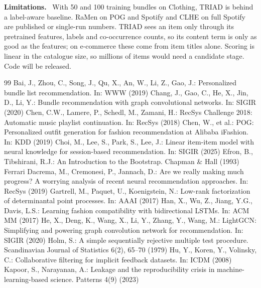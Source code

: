 \documentclass[runningheads]{llncs}
\renewcommand{\paragraph}[1]{\smallskip\noindent\textbf{#1}\ }
\begin{document}
\paragraph{Limitations.} With 50 and 100 training bundles on Clothing, TRIAD is behind a label-aware baseline. RaMen
on POG and Spotify and CLHE on full Spotify are published or single-run numbers. TRIAD sees an item only through its
pretrained features, labels and co-occurrence counts, so its content term is only as good as the features; on
e-commerce these come from item titles alone. Scoring is linear in the catalogue size, so millions of items would need
a candidate stage. Code will be released.

\begin{thebibliography}{99}\scriptsize
{} Bai, J., Zhou, C., Song, J., Qu, X., An, W., Li, Z., Gao, J.: Personalized bundle list recommendation. In: WWW (2019)
 Chang, J., Gao, C., He, X., Jin, D., Li, Y.: Bundle recommendation with graph convolutional networks. In: SIGIR (2020)
 Chen, C.W., Lamere, P., Schedl, M., Zamani, H.: RecSys Challenge 2018: Automatic music playlist continuation. In: RecSys (2018)
 Chen, W., et al.: POG: Personalized outfit generation for fashion recommendation at Alibaba iFashion. In: KDD (2019)
 Choi, M., Lee, S., Park, S., Lee, J.: Linear item-item model with neural knowledge for session-based recommendation. In: SIGIR (2025)
 Efron, B., Tibshirani, R.J.: An Introduction to the Bootstrap. Chapman \& Hall (1993)
 Ferrari Dacrema, M., Cremonesi, P., Jannach, D.: Are we really making much progress? A worrying analysis of recent neural recommendation approaches. In: RecSys (2019)
 Gartrell, M., Paquet, U., Koenigstein, N.: Low-rank factorization of determinantal point processes. In: AAAI (2017)
 Han, X., Wu, Z., Jiang, Y.G., Davis, L.S.: Learning fashion compatibility with bidirectional LSTMs. In: ACM MM (2017)
 He, X., Deng, K., Wang, X., Li, Y., Zhang, Y., Wang, M.: LightGCN: Simplifying and powering graph convolution network for recommendation. In: SIGIR (2020)
 Holm, S.: A simple sequentially rejective multiple test procedure. Scandinavian Journal of Statistics 6(2), 65--70 (1979)
 Hu, Y., Koren, Y., Volinsky, C.: Collaborative filtering for implicit feedback datasets. In: ICDM (2008)
 Kapoor, S., Narayanan, A.: Leakage and the reproducibility crisis in machine-learning-based science. Patterns 4(9) (2023)

\end{thebibliography}
\end{document}
